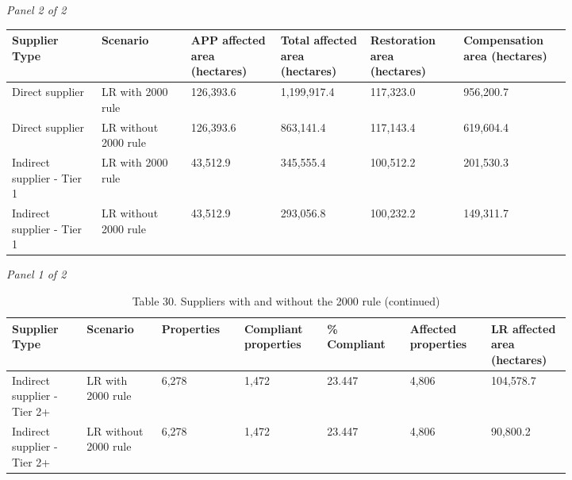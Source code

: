 \documentclass[12pt]{article}
\begin{document}
\begin{landscape}
\begin{table}[H]
\textit{Panel 2 of 2}\\[2pt]
{\fontsize{12}{14}\selectfont
\setlength{\tabcolsep}{3pt}
\renewcommand{\arraystretch}{1.08}
\begin{tabular}{p{0.137\linewidth}p{0.137\linewidth}p{0.137\linewidth}p{0.137\linewidth}p{0.137\linewidth}p{0.137\linewidth}}
\toprule
Supplier Type & Scenario & APP affected area (hectares) & Total affected area (hectares) & Restoration area (hectares) & Compensation area (hectares) \\
\midrule
Direct supplier & LR with 2000 rule & 126,393.6 & 1,199,917.4 & 117,323.0 & 956,200.7 \\
Direct supplier & LR without 2000 rule & 126,393.6 & 863,141.4 & 117,143.4 & 619,604.4 \\
Indirect supplier - Tier 1 & LR with 2000 rule & 43,512.9 & 345,555.4 & 100,512.2 & 201,530.3 \\
Indirect supplier - Tier 1 & LR without 2000 rule & 43,512.9 & 293,056.8 & 100,232.2 & 149,311.7 \\
\bottomrule
\end{tabular}
}
\end{table}
\begin{table}[H]
\centering
\caption{Table 30. Suppliers with and without the 2000 rule (continued)}
\textit{Panel 1 of 2}\\[2pt]
{\fontsize{12}{14}\selectfont
\setlength{\tabcolsep}{3pt}
\renewcommand{\arraystretch}{1.08}
\begin{tabular}{p{0.117\linewidth}p{0.117\linewidth}p{0.117\linewidth}p{0.117\linewidth}p{0.117\linewidth}p{0.117\linewidth}p{0.117\linewidth}}
\toprule
Supplier Type & Scenario & Properties & Compliant properties & \% Compliant & Affected properties & LR affected area (hectares) \\
\midrule
Indirect supplier - Tier 2+ & LR with 2000 rule & 6,278 & 1,472 & 23.447 & 4,806 & 104,578.7 \\
Indirect supplier - Tier 2+ & LR without 2000 rule & 6,278 & 1,472 & 23.447 & 4,806 & 90,800.2 \\
\bottomrule
\end{tabular}
}

\vspace{0.6em}


\end{table}
\end{landscape}
\end{document}
